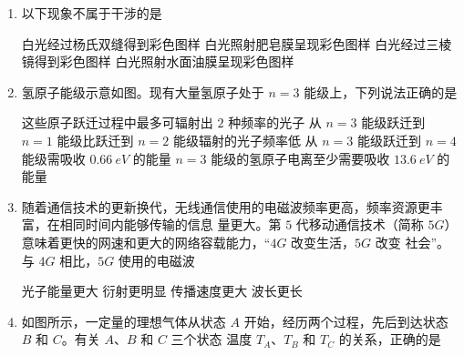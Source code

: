 





\gaokaoxz

\begin{enumerate}
\item
以下现象不属于干涉的是  

\fourchoices
{白光经过杨氏双缝得到彩色图样}
{白光照射肥皂膜呈现彩色图样}
{白光经过三棱镜得到彩色图样}
{白光照射水面油膜呈现彩色图样}


\item
氢原子能级示意如图。现有大量氢原子处于 $ n = 3 $ 能级上，下列说法正确的是  
\begin{figure}[h!]
\centering

\end{figure}

\fourchoices
{这些原子跃迁过程中最多可辐射出 $ 2 $ 种频率的光子}
{从 $ n = 3 $ 能级跃迁到 $ n = 1 $ 能级比跃迁到 $ n = 2 $ 能级辐射的光子频率低}
{从 $ n =3 $ 能级跃迁到 $ n = 4 $ 能级需吸收 $ 0.66 \ eV $ 的能量}
{$ n = 3 $ 能级的氢原子电离至少需要吸收 $ 13.6 \ eV $ 的能量}


\item
随着通信技术的更新换代，无线通信使用的电磁波频率更高，频率资源更丰富，在相同时间内能够传输的信息
量更大。第 $ 5 $ 代移动通信技术（简称 $ 5G $）意味着更快的网速和更大的网络容载能力，“$ 4G $ 改变生活，$ 5G $ 改变
社会”。与 $ 4G $ 相比，$ 5G $ 使用的电磁波  


\fourchoices
{光子能量更大}
{衍射更明显}
{传播速度更大}
{波长更长}



\item
如图所示，一定量的理想气体从状态 $ A $ 开始，经历两个过程，先后到达状态 $ B $ 和 $ C $。有关 $ A $、$ B $ 和 $ C $ 三个状态
温度 $ T_{A} $、$ T_{B} $ 和 $ T_{C} $ 的关系，正确的是  
\begin{figure}[h!]
\centering
\end{figure}
\end{enumerate}
